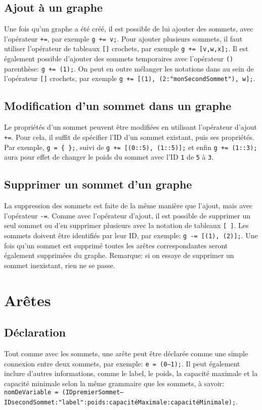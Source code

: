 \documentclass[french]{article}
\begin{document}
		\subsection{Ajout à un graphe}
		Une fois qu'un graphe a été créé, il est possible de lui ajouter des sommets, avec l'opérateur \texttt{+=}, par exemple \texttt{g += v;}. Pour ajouter plusieurs sommets, il faut utiliser l'opérateur de tableaux \texttt{[]} crochets, par exemple \texttt{g += [v,w,x];}. Il est également possible d'ajouter des sommets temporaires avec l'opérateur \texttt{()} parenthèse: \texttt{g += (1);}. On peut en outre mélanger les notations dans au sein de l'opérateur \texttt{[]} crochets, par exemple \texttt{g += [(1), (2:"monSecondSommet"), w];}.
		
		\subsection{Modification d'un sommet dans un graphe}
		Le propriétés d'un sommet peuvent être modifiées en utilisant l'opérateur d'ajout \texttt{+=}. Pour cela, il suffit de spécifier l'ID d'un sommet existant, puis ses propriétés. Par exemple, \texttt{g = \{ \};}, suivi de \texttt{g += [(0::5), (1::5)];} et enfin \texttt{g += (1::3);} aura pour effet de changer le poids du sommet avec l'ID \texttt{1} de \texttt{5} à \texttt{3}.
		
		\subsection{Supprimer un sommet d'un graphe}
		La suppression des sommets est faite de la même manière que l'ajout, mais avec l'opérateur \texttt{-=}. Comme avec l'opérateur d'ajout, il est possible de supprimer un seul sommet ou d'en supprimer plusieurs avec la notation de tableaux \texttt{[ ]}. Les sommets doivent être identifiés par leur ID, par exemple: \texttt{g -= [(1), (2)];}. Une fois qu'un sommet est supprimé toutes les arêtes correspondantes seront également supprimées du graphe. Remarque: si on essaye de supprimer un sommet inexistant, rien ne se passe.
		
	\section{Arêtes}
		\subsection{Déclaration}
		Tout comme avec les sommets, une arête peut être déclarée comme une simple connexion entre deux sommets, par exemple: \texttt{e = (0--1);}. Il peut également inclure d'autres informations, comme le label, le poids, la capacité maximale et la capacité minimale selon la même grammaire que les sommets, à savoir: \texttt{nomDeVariable = (IDpremierSommet--IDsecondSommet:"label":poids:capacitéMaximale:capacitéMinimale);}.
		
\end{document}
